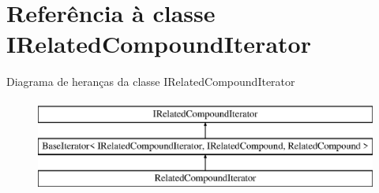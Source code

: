 \hypertarget{class_i_related_compound_iterator}{\section{Referência à classe I\-Related\-Compound\-Iterator}
\label{class_i_related_compound_iterator}
}
Diagrama de heranças da classe I\-Related\-Compound\-Iterator\begin{figure}[H]
\begin{center}
\leavevmode
\includegraphics[height=3.000000cm]{class_i_related_compound_iterator}
\end{center}
\end{figure}
